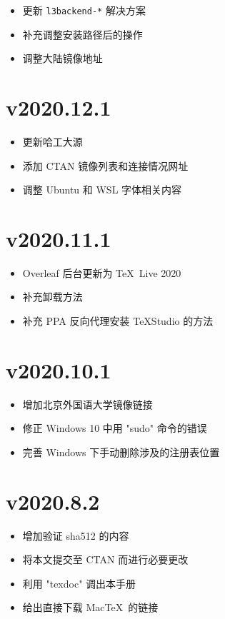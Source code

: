 \begin{itemize}
  \item 更新 \texttt{l3backend-*} 解决方案
  \item 补充调整安装路径后的操作
  \item 调整大陆镜像地址
\end{itemize}
\section*{v2020.12.1}

\begin{itemize}
  \item 更新哈工大源
  \item 添加 CTAN 镜像列表和连接情况网址
  \item 调整 Ubuntu 和 WSL 字体相关内容
\end{itemize}

\section*{v2020.11.1}

\begin{itemize}
  \item Overleaf 后台更新为 \TeX\ Live 2020
  \item 补充卸载方法
  \item 补充 PPA 反向代理安装 \TeX Studio 的方法
\end{itemize}

\section*{v2020.10.1}

\begin{itemize}
  \item 增加北京外国语大学镜像链接
  \item 修正 Windows 10 中用 "sudo" 命令的错误
  \item 完善 Windows 下手动删除涉及的注册表位置
\end{itemize}

\section*{v2020.8.2}

\begin{itemize}
  \item 增加验证 sha512 的内容
  \item 将本文提交至 CTAN 而进行必要更改
  \item 利用 "texdoc" 调出本手册
  \item 给出直接下载 Mac\TeX\ 的链接
\end{itemize}


